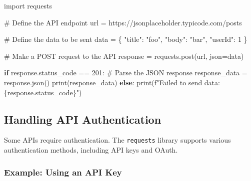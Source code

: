 \documentclass[
  letterpaper,
  DIV=11,
  numbers=noendperiod]{scrreprt}
\newenvironment{Shaded}{\begin{snugshade}}{\end{snugshade}}
\newcommand{\BuiltInTok}[1]{\textcolor[rgb]{0.00,0.23,0.31}{#1}}
\newcommand{\CommentTok}[1]{\textcolor[rgb]{0.37,0.37,0.37}{#1}}
\newcommand{\ControlFlowTok}[1]{\textcolor[rgb]{0.00,0.23,0.31}{\textbf{#1}}}
\newcommand{\DecValTok}[1]{\textcolor[rgb]{0.68,0.00,0.00}{#1}}
\newcommand{\ImportTok}[1]{\textcolor[rgb]{0.00,0.46,0.62}{#1}}
\newcommand{\NormalTok}[1]{\textcolor[rgb]{0.00,0.23,0.31}{#1}}
\newcommand{\OperatorTok}[1]{\textcolor[rgb]{0.37,0.37,0.37}{#1}}
\newcommand{\SpecialCharTok}[1]{\textcolor[rgb]{0.37,0.37,0.37}{#1}}
\newcommand{\SpecialStringTok}[1]{\textcolor[rgb]{0.13,0.47,0.30}{#1}}
\newcommand{\StringTok}[1]{\textcolor[rgb]{0.13,0.47,0.30}{#1}}
\begin{document}
\begin{Shaded}
\begin{Highlighting}[]
\ImportTok{import}\NormalTok{ requests}

\CommentTok{\# Define the API endpoint}
\NormalTok{url }\OperatorTok{=} \StringTok{\textquotesingle{}https://jsonplaceholder.typicode.com/posts\textquotesingle{}}

\CommentTok{\# Define the data to be sent}
\NormalTok{data }\OperatorTok{=}\NormalTok{ \{}
    \StringTok{"title"}\NormalTok{: }\StringTok{"foo"}\NormalTok{,}
    \StringTok{"body"}\NormalTok{: }\StringTok{"bar"}\NormalTok{,}
    \StringTok{"userId"}\NormalTok{: }\DecValTok{1}
\NormalTok{\}}

\CommentTok{\# Make a POST request to the API}
\NormalTok{response }\OperatorTok{=}\NormalTok{ requests.post(url, json}\OperatorTok{=}\NormalTok{data)}

\ControlFlowTok{if}\NormalTok{ response.status\_code }\OperatorTok{==} \DecValTok{201}\NormalTok{:}
    \CommentTok{\# Parse the JSON response}
\NormalTok{    response\_data }\OperatorTok{=}\NormalTok{ response.json()}
    \BuiltInTok{print}\NormalTok{(response\_data)}
\ControlFlowTok{else}\NormalTok{:}
    \BuiltInTok{print}\NormalTok{(}\SpecialStringTok{f"Failed to send data: }\SpecialCharTok{\{}\NormalTok{response}\SpecialCharTok{.}\NormalTok{status\_code}\SpecialCharTok{\}}\SpecialStringTok{"}\NormalTok{)}
\end{Highlighting}
\end{Shaded}

\subsection{Handling API
Authentication}\label{handling-api-authentication}

Some APIs require authentication. The \texttt{requests} library supports
various authentication methods, including API keys and OAuth.

\subsubsection{Example: Using an API
Key}\label{example-using-an-api-key}
\end{document}
